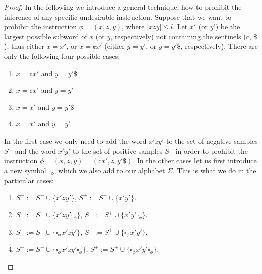 \begin{proof}
In the following we introduce a general technique, how to prohibit the inference of any specific undesirable instruction. Suppose that we want to prohibit the instruction $\phi = (x, z, y)$, where $|xzy| \le l$. Let $x'$ (or $y'$) be the largest possible subword of $x$ (or $y$, respectively) not containing the sentinels ($\cent$, $\$$); thus either $x = x'$, or $x = \cent x'$ (either $y = y'$, or $y = y'\$$, respectively). There are only the following four possible cases:
\begin{enumerate}
\item $x = \cent x'$ and $y = y' \$$
\item $x = \cent x'$ and $y = y'$
\item $x = x'$ and $y = y' \$$
\item $x = x'$ and $y = y'$
\end{enumerate}
In the first case we only need to add the word $x'zy'$ to the set of negative samples $S^-$ and the word $x'y'$ to the set of positive samples $S^+$ in order to prohibit the instruction $\phi = (x, z, y) = (\cent x', z, y' \$)$. In the other cases let us first introduce a new symbol $\square_{\phi}$, which we also add to our alphabet $\Sigma$. This is what we do in the particular cases:
\begin{enumerate}
\item $S^- := S^- \cup \{ x'zy' \}$, $S^+ := S^+ \cup \{  x'y' \}$.
\item $S^- := S^- \cup \{ x'zy'  \square_{\phi} \}$, $S^+ := S^+ \cup \{  x'y'  \square_{\phi} \}$.
\item $S^- := S^- \cup \{ \square_{\phi} x'zy' \}$, $S^+ := S^+ \cup \{ \square_{\phi} x'y' \}$.
\item $S^- := S^- \cup \{ \square_{\phi} x'zy' \square_{\phi} \}$, $S^+ := S^+ \cup \{ \square_{\phi} x'y' \square_{\phi} \}$.
\end{enumerate}

\end{proof}
